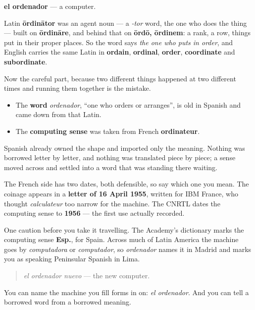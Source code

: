 \begin{cousinweb}
\textbf{el ordenador} — a computer.

Latin \textbf{ōrdinātor} was an agent noun — a \emph{-tor} word, the one who does the thing — built on \textbf{ōrdināre}, and behind that on \textbf{ōrdō, ōrdinem}: a rank, a row, things put in their proper places. So the word says \emph{the one who puts in order}, and English carries the same Latin in \textbf{ordain}, \textbf{ordinal}, \textbf{order}, \textbf{coordinate} and \textbf{subordinate}.

Now the careful part, because two different things happened at two different times and running them together is the mistake.

\begin{itemize}
\raggedright
  \item The \textbf{word} \emph{ordenador}, \textquotedblleft{}one who orders or arranges\textquotedblright{}, is old in Spanish and came down from that Latin.
  \item The \textbf{computing sense} was taken from French \textbf{ordinateur}.
\end{itemize}

Spanish already owned the shape and imported only the meaning. Nothing was borrowed letter by letter, and nothing was translated piece by piece; a sense moved across and settled into a word that was standing there waiting.

The French side has two dates, both defensible, so say which one you mean. The coinage appears in a \textbf{letter of 16 April 1955}, written for IBM France, who thought \emph{calculateur} too narrow for the machine. The CNRTL dates the computing sense to \textbf{1956} — the first use actually recorded.

One caution before you take it travelling. The Academy's dictionary marks the computing sense \textbf{Esp.}, for Spain. Across much of Latin America the machine goes by \emph{computadora} or \emph{computador}, so \emph{ordenador} names it in Madrid and marks you as speaking Peninsular Spanish in Lima.

\begin{quote}
\emph{el ordenador nuevo} — the new computer.
\end{quote}
\end{cousinweb}

\begin{grammarlens}[title={What you've built}]
You can name the machine you fill forms in on: \emph{el ordenador}. And you can tell a borrowed word from a borrowed meaning.
\end{grammarlens}

